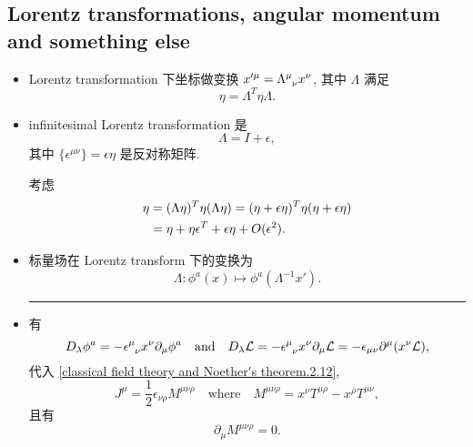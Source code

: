 \subsection{Lorentz transformations, angular momentum and something else}
\begin{itemize}
	\item Lorentz transformation 下坐标做变换 $x'^\mu = \tensor{\Lambda}{^\mu_\nu} x^\nu$, 其中 $\Lambda$ 满足
	\begin{equation}
		\eta = \Lambda^T \eta \Lambda.
	\end{equation}
	
	\item infinitesimal Lorentz transformation 是
	\begin{equation}
		\Lambda = I + \epsilon,
	\end{equation}
	其中 $\{\epsilon^{\mu \nu}\} = \epsilon \eta$ 是反对称矩阵.
	
	\begin{tcolorbox}[title=proof:]
		考虑
		\begin{align}
			\eta &= (\Lambda \eta)^T \eta (\Lambda \eta) = (\eta + \epsilon \eta)^T \eta (\eta + \epsilon \eta) \notag \\
			&= \eta + \eta \epsilon^T + \epsilon \eta + O(\epsilon^2).
		\end{align}
	\end{tcolorbox}
	
	\noindent\hdashrule[0.5ex]{\linewidth}{0.5pt}{1mm} %
	
	\item 标量场在 Lorentz transform 下的变换为
	\begin{equation}
		\Lambda : \phi^a(x) \mapsto \phi^a(\Lambda^{- 1} x').
	\end{equation}
	
	\noindent\rule[0.5ex]{\linewidth}{0.5pt} %
	
	\item 有
	\begin{equation}
		D_\lambda \phi^a = - \tensor{\epsilon}{^\mu_\nu} x^\nu \partial_\mu \phi^a \quad \text{and} \quad D_\lambda \mathcal{L} = - \tensor{\epsilon}{^\mu_\nu} x^\nu \partial_\mu \mathcal{L} = - \epsilon_{\mu \nu} \partial^\mu(x^\nu \mathcal{L}),
	\end{equation}
	代入 \eqref{classical field theory and Noether's theorem.2.12},
	\begin{equation}
		J^\mu = \frac{1}{2} \epsilon_{\nu \rho} M^{\mu \nu \rho} \quad \text{where} \quad M^{\mu \nu \rho} = x^\nu T^{\mu \rho} - x^\rho T^{\mu \nu},
	\end{equation}
	且有
	\begin{equation}
		\partial_\mu M^{\mu \nu \rho} = 0.
	\end{equation}
	

\end{itemize}
